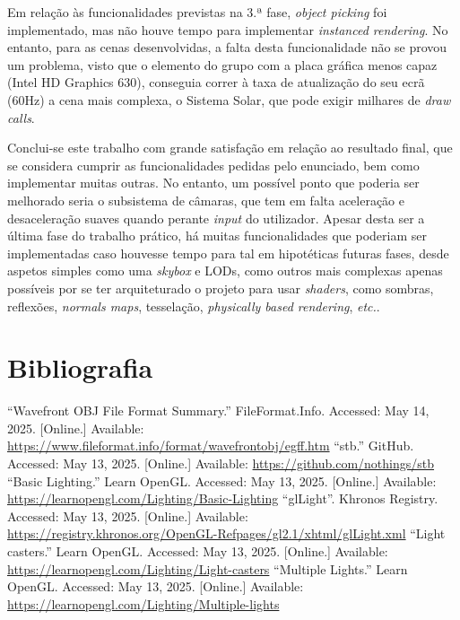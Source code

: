 \documentclass[12pt, a4paper]{article}
\begin{document}
Em relação às funcionalidades previstas na 3.ª fase, \emph{object picking} foi implementado, mas não
houve tempo para implementar \emph{instanced rendering}. No entanto, para as cenas desenvolvidas, a
falta desta funcionalidade não se provou um problema, visto que o elemento do grupo com a placa
gráfica menos capaz (Intel HD Graphics 630), conseguia correr à taxa de atualização do seu ecrã
(60Hz) a cena mais complexa, o Sistema Solar, que pode exigir milhares de \emph{draw calls}.

Conclui-se este trabalho com grande satisfação em relação ao resultado final, que se considera
cumprir as funcionalidades pedidas pelo enunciado, bem como implementar muitas outras. No entanto,
um possível ponto que poderia ser melhorado seria o subsistema de câmaras, que tem em
falta aceleração e desaceleração suaves quando perante \emph{input} do utilizador. Apesar desta ser
a última fase do trabalho prático, há muitas funcionalidades que poderiam ser implementadas caso
houvesse tempo para tal em hipotéticas futuras fases, desde aspetos simples como uma \emph{skybox} e
LODs, como outros mais complexas apenas possíveis por se ter arquiteturado o projeto para usar
\emph{shaders}, como sombras, reflexões, \emph{normals maps}, tesselação, \emph{physically based
rendering}, \emph{etc.}.

\begingroup
\section{Bibliografia}
\renewcommand{\section}[2]{}

\begin{thebibliography}{9}
        ``Wavefront OBJ File Format Summary.''{} FileFormat.Info. Accessed: May 14, 2025. [Online.]
        Available: \url{https://www.fileformat.info/format/wavefrontobj/egff.htm}
        ``stb.'' GitHub. Accessed: May 13, 2025. [Online.] Available:
        \url{https://github.com/nothings/stb}
        ``Basic Lighting.'' Learn OpenGL. Accessed: May 13, 2025. [Online.] Available:
        \url{https://learnopengl.com/Lighting/Basic-Lighting}
        ``glLight''. Khronos Registry. Accessed: May 13, 2025. [Online.] Available:
        \url{https://registry.khronos.org/OpenGL-Refpages/gl2.1/xhtml/glLight.xml}
        ``Light casters.'' Learn OpenGL. Accessed: May 13, 2025. [Online.] Available:
        \url{https://learnopengl.com/Lighting/Light-casters}
        ``Multiple Lights.'' Learn OpenGL. Accessed: May 13, 2025. [Online.] Available:
        \url{https://learnopengl.com/Lighting/Multiple-lights}
\end{thebibliography}
\endgroup
\end{document}
